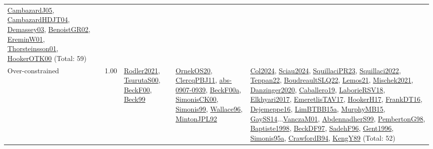 {\begin{longtable}{p{3cm}r>{\raggedright\arraybackslash}p{6cm}>{\raggedright\arraybackslash}p{6cm}>{\raggedright\arraybackslash}p{8cm}}
\hyperref[detail:CambazardJ05]{CambazardJ05}, \hyperref[detail:CambazardHDJT04]{CambazardHDJT04}, \hyperref[detail:Demassey03]{Demassey03}, \hyperref[detail:BenoistGR02]{BenoistGR02}, \hyperref[detail:EreminW01]{EreminW01}, \hyperref[detail:Thorsteinsson01]{Thorsteinsson01}, \hyperref[detail:HookerOTK00]{HookerOTK00} (Total: 59)\\
\index{Over-constrained}\index{Concepts!Over-constrained}Over-constrained &  1.00 & \hyperref[detail:Rodler2021]{Rodler2021}, \hyperref[detail:TsurutaS00]{TsurutaS00}, \hyperref[detail:BeckF00]{BeckF00}, \hyperref[detail:Beck99]{Beck99} & \hyperref[detail:OrnekOS20]{OrnekOS20}, \hyperref[detail:ClercqPBJ11]{ClercqPBJ11}, \hyperref[detail:abs-0907-0939]{abs-0907-0939}, \hyperref[detail:BeckF00a]{BeckF00a}, \hyperref[detail:SimonisCK00]{SimonisCK00}, \hyperref[detail:Simonis99]{Simonis99}, \hyperref[detail:Wallace96]{Wallace96}, \hyperref[detail:MintonJPL92]{MintonJPL92} & \hyperref[detail:Col2024]{Col2024}, \hyperref[detail:Sciau2024]{Sciau2024}, \hyperref[detail:SquillaciPR23]{SquillaciPR23}, \hyperref[detail:Squillaci2022]{Squillaci2022}, \hyperref[detail:Teppan22]{Teppan22}, \hyperref[detail:BoudreaultSLQ22]{BoudreaultSLQ22}, \hyperref[detail:Lemos21]{Lemos21}, \hyperref[detail:Mischek2021]{Mischek2021}, \hyperref[detail:Danzinger2020]{Danzinger2020}, \hyperref[detail:Caballero19]{Caballero19}, \hyperref[detail:LaborieRSV18]{LaborieRSV18}, \hyperref[detail:Elkhyari2017]{Elkhyari2017}, \hyperref[detail:EmeretlisTAV17]{EmeretlisTAV17}, \hyperref[detail:HookerH17]{HookerH17}, \hyperref[detail:FrankDT16]{FrankDT16}, \hyperref[detail:Dejemeppe16]{Dejemeppe16}, \hyperref[detail:LimBTBB15a]{LimBTBB15a}, \hyperref[detail:MurphyMB15]{MurphyMB15}, \hyperref[detail:GaySS14]{GaySS14}...\hyperref[detail:VanczaM01]{VanczaM01}, \hyperref[detail:AbdennadherS99]{AbdennadherS99}, \hyperref[detail:PembertonG98]{PembertonG98}, \hyperref[detail:Baptiste1998]{Baptiste1998}, \hyperref[detail:BeckDF97]{BeckDF97}, \hyperref[detail:SadehF96]{SadehF96}, \hyperref[detail:Gent1996]{Gent1996}, \hyperref[detail:Simonis95a]{Simonis95a}, \hyperref[detail:CrawfordB94]{CrawfordB94}, \hyperref[detail:KengY89]{KengY89} (Total: 52)\\

\end{longtable}}
